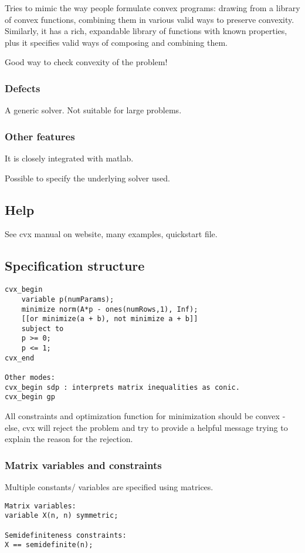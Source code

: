 Tries to mimic the way people formulate convex programs: drawing from a library of convex functions, combining them in various valid ways to preserve convexity. Similarly, it has a rich, expandable library of functions with known properties, plus it specifies valid ways of composing and combining them.

Good way to check convexity of the problem!

\subsubsection{Defects}
A generic solver. Not suitable for large problems.

\subsubsection{Other features}
It is closely integrated with matlab.

Possible to specify the underlying solver used.

\subsection{Help}
See cvx manual on website, many examples, quickstart file.

\subsection{Specification structure}
\begin{lstlisting}
cvx_begin
    variable p(numParams);
    minimize norm(A*p - ones(numRows,1), Inf);
    [[or minimize(a + b), not minimize a + b]]
    subject to
    p >= 0;
    p <= 1;
cvx_end

Other modes:
cvx_begin sdp : interprets matrix inequalities as conic.
cvx_begin gp
\end{lstlisting}

All constraints and optimization function for minimization should be convex - else, cvx will reject the problem and try to provide a helpful message trying to explain the reason for the rejection.

\subsubsection{Matrix variables and constraints}
Multiple constants/ variables are specified using matrices.

\begin{verbatim}
Matrix variables:
variable X(n, n) symmetric;

Semidefiniteness constraints:
X == semidefinite(n);
\end{verbatim}

